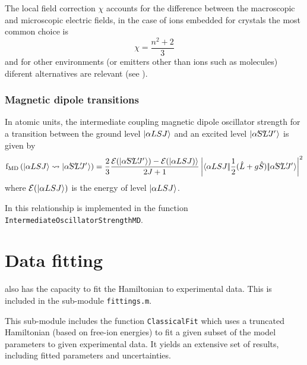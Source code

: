 \documentclass{article}
\newcommand{\codetext}[1]{{\color{BlueViolet} \texttt{#1}}}
\begin{document}
The local field correction $\chi$ accounts for the difference between the macroscopic and microscopic electric fields, in the case of ions embedded for crystals the most common choice is 
\begin{equation}
	\chi = \frac{n^2+2}{3}  
\end{equation}
and for other environments (or emitters other than ions such as molecules) diferent alternatives are relevant (see \cite{duan_dependence_2006}).


\subsubsection{Magnetic dipole transitions}

In atomic units, the intermediate coupling magnetic dipole oscillator strength for a transition between the ground level $|\alpha{LSJ}\rangle$ and an excited level $\ket{\alpha\mathrlap{'} S\mathrlap{'} L\mathrlap{'} J\mathrlap{'}\,\,}$ is given by \cite{rudzikas_theoretical_2007}
\begin{equation} 
	\oStrength{MD}{\alpha{LSJ}}{\alpha\mathrlap{'} S\mathrlap{'} L\mathrlap{'} J\mathrlap{'}\,\,} = \frac{2}{3}
	\frac{
	\mathcal{E}(
		\ket{\alpha\mathrlap{'}
			S\mathrlap{'}
			L\mathrlap{'}
			J\mathrlap{'}\,\,})-
	\mathcal{E}(
		\ket{\alpha{LSJ})}}
	{2J+1} 
	\left|\redbraopket{\alpha{LSJ}}{\frac{1}{2}(\op{L}+g \op{S})}{\alpha\mathrlap{'} S\mathrlap{'} L\mathrlap{'} J\mathrlap{'}\,\,} \right|^2
\end{equation}
where $\mathcal{E}(|\alpha{LSJ}\rangle)$ is the energy of level $|\alpha{LSJ}\rangle$.

In \qlanth this relationship is implemented in the function \codetext{IntermediateOscillatorStrengthMD}.

 

\section{Data fitting}

\qlanth also has the capacity to fit the Hamiltonian to experimental data. This is included in the sub-module \codetext{fittings.m}.

This sub-module includes the function \codetext{ClassicalFit} which uses a truncated Hamiltonian (based on free-ion energies) to fit a given subset of the model parameters to given experimental data. It yields an extensive set of results, including fitted parameters and uncertainties.
\end{document}
